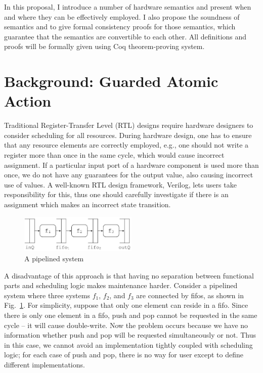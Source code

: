 In this proposal, I introduce a number of hardware semantics and
present when and where they can be effectively employed. I also
propose the soundness of semantics and to give formal consistency
proofs for those semantics, which guarantee that the semantics are
convertible to each other. All definitions and proofs will be formally
given using Coq theorem-proving system.

\section{Background: Guarded Atomic Action}\label{sec:background}
Traditional Register-Transfer Level (RTL) designs require hardware
designers to consider scheduling for all resources. During hardware
design, one has to ensure that any resource elements are correctly
employed, e.g., one should not write a register more than once in the
same cycle, which would cause incorrect assignment. If a particular
input port of a hardware component is used more than once, we do not
have any guarantees for the output value, also causing incorrect use
of values. A well-known RTL design framework, Verilog, lets users take
responsibility for this, thus one should carefully investigate if
there is an assignment which makes an incorrect state transition.
\begin{figure}[h]
  \centering
  \includegraphics[width=0.5\textwidth]{figures/pipeline.pdf}
  \caption{A pipelined system}
  \label{fig:pipeline}
\end{figure}

A disadvantage of this approach is that having no separation between
functional parts and scheduling logic makes maintenance
harder. Consider a pipelined system where three systems $f_1$, $f_2$,
and $f_3$ are connected by fifos, as shown in
Fig.~\ref{fig:pipeline}. For simplicity, suppose that only one element
can reside in a fifo. Since there is only one element in a fifo, push
and pop cannot be requested in the same cycle -- it will cause
double-write. Now the problem occurs because we have no information
whether push and pop will be requested simultaneously or not. Thus in
this case, we cannot avoid an implementation tightly coupled with
scheduling logic; for each case of push and pop, there is no way for
user except to define different implementations.

